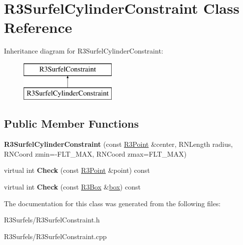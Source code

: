 \hypertarget{class_r3_surfel_cylinder_constraint}{}\section{R3\+Surfel\+Cylinder\+Constraint Class Reference}
\label{class_r3_surfel_cylinder_constraint}
Inheritance diagram for R3\+Surfel\+Cylinder\+Constraint\+:\begin{figure}[H]
\begin{center}
\leavevmode
\includegraphics[height=2.000000cm]{class_r3_surfel_cylinder_constraint}
\end{center}
\end{figure}
\subsection*{Public Member Functions}
\begin{DoxyCompactItemize}
\item 
{\bfseries R3\+Surfel\+Cylinder\+Constraint} (const \hyperlink{class_r3_point}{R3\+Point} \&center, R\+N\+Length radius, R\+N\+Coord zmin=-\/F\+L\+T\+\_\+\+M\+AX, R\+N\+Coord zmax=F\+L\+T\+\_\+\+M\+AX)\hypertarget{class_r3_surfel_cylinder_constraint_a4826ed697d70393dd3a035e0b2506345}{}\label{class_r3_surfel_cylinder_constraint_a4826ed697d70393dd3a035e0b2506345}

\item 
virtual int {\bfseries Check} (const \hyperlink{class_r3_point}{R3\+Point} \&point) const \hypertarget{class_r3_surfel_cylinder_constraint_a33315cce4f05ce22f9dee3bf65aebac2}{}\label{class_r3_surfel_cylinder_constraint_a33315cce4f05ce22f9dee3bf65aebac2}

\item 
virtual int {\bfseries Check} (const \hyperlink{class_r3_box}{R3\+Box} \&\hyperlink{structbox}{box}) const \hypertarget{class_r3_surfel_cylinder_constraint_a6f81269f9f1d9b80cac708d767a8ecd2}{}\label{class_r3_surfel_cylinder_constraint_a6f81269f9f1d9b80cac708d767a8ecd2}

\end{DoxyCompactItemize}


The documentation for this class was generated from the following files\+:\begin{DoxyCompactItemize}
\item 
R3\+Surfels/R3\+Surfel\+Constraint.\+h\item 
R3\+Surfels/R3\+Surfel\+Constraint.\+cpp\end{DoxyCompactItemize}
